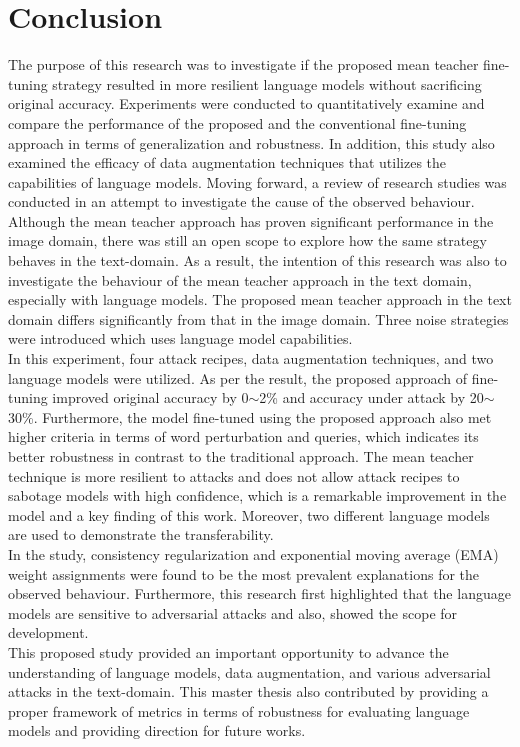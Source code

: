 \documentclass[%
	BCOR=8mm, %
	DIV=12,
	toc=bibliography, %
	toc=listof, %
	oneside, %
	egregdoesnotlikesansseriftitles, %
	]{scrbook}
\begin{document}
\section{Conclusion}
\label{section:conclusion}
The purpose of this research was to investigate if the proposed mean teacher fine-tuning strategy resulted in more resilient language models without sacrificing original accuracy. Experiments were conducted to quantitatively examine and compare the performance of the proposed and the conventional fine-tuning approach in terms of generalization and robustness. In addition, this study also examined the efficacy of data augmentation techniques that utilizes the capabilities of language models. Moving forward, a review of research studies was conducted in an attempt to investigate the cause of the observed behaviour. \\
Although the mean teacher approach has proven significant performance in the image domain, there was still an open scope to explore how the same strategy behaves in the text-domain. As a result, the intention of this research was also to investigate the behaviour of the mean teacher approach in the text domain, especially with language models. The proposed mean teacher approach in the text domain differs significantly from that in the image domain. Three noise strategies were introduced which uses language model capabilities.\\
In this experiment, four attack recipes, data augmentation techniques, and two language models were utilized. As per the result, the proposed approach of fine-tuning improved original accuracy by 0$\sim$2\% and accuracy under attack by 20$\sim$30\%. Furthermore, the model fine-tuned using the proposed approach also met higher criteria in terms of word perturbation and queries, which indicates its better robustness in contrast to the traditional approach. The mean teacher technique is more resilient to attacks and does not allow attack recipes to sabotage models with high confidence, which is a remarkable improvement in the model and a key finding of this work. Moreover, two different language models are used to demonstrate the transferability.\\
In the study, consistency regularization and exponential moving average (EMA) weight assignments were found to be the most prevalent explanations for the observed behaviour. Furthermore, this research first highlighted that the language models are sensitive to adversarial attacks and also, showed the scope for development. \\
This proposed study provided an important opportunity to advance the understanding of language models, data augmentation, and various adversarial attacks in the text-domain. This master thesis also contributed by providing a proper framework of metrics in terms of robustness for evaluating language models and providing direction for future works.
\end{document}
